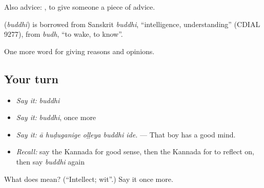Also advice:  , to give someone a piece of advice.

\begin{cousinweb}
\textbf{} (\emph{buddhi}) is borrowed from Sanskrit \emph{buddhi}, \textquotedblleft{}intelligence, understanding\textquotedblright{} (CDIAL 9277), from \emph{budh}, \textquotedblleft{}to wake, to know\textquotedblright{}.
\end{cousinweb}

\begin{grammarlens}[title={What you've built}]
One more word for giving reasons and opinions.
\end{grammarlens}

\subsection*{Your turn}
\begin{itemize}
\raggedright
  \item \emph{Say it:} \emph{buddhi}
  \item \emph{Say it:} \emph{buddhi}, once more
  \item \emph{Say it:} \emph{ā huḍuganige oḷḷeya buddhi ide.} — That boy has a good mind.
  \item \emph{Recall:} say the Kannada for good sense, then the Kannada for to reflect on, then say \emph{buddhi} again
\end{itemize}

\begin{tcolorbox}[breakable,colback=teal!4,colframe=teal!35!black,title={Before you move on}]
What does  mean? (\textquotedblleft{}Intellect; wit\textquotedblright{}.) Say it once more.
\end{tcolorbox}
